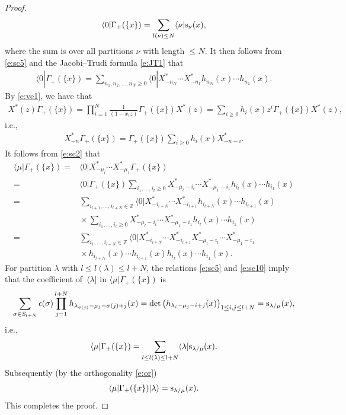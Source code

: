 \documentclass[10pt,a4paper]{amsart}
\numberwithin{equation}{section}
\begin{document}
\begin{proof}
\begin{align}
\langle0|\Gamma_+(\{x\})=\sum_{\substack{l(\nu)\leq N}}\langle\nu|{\rm s}_\nu(x),
\end{align}
where the sum is over all partitions $\nu$ with length $\leq N$. It then follows from \eqref{e:sc5} and the Jacobi--Trudi formula \eqref{e:JT1} that
\begin{align*}%
\langle0|\Gamma_+(\{x\})=\sum_{n_1,n_2,\dots,n_N\geq 0}\langle 0|X^*_{-n_N}\cdots X^*_{-n_1}h_{n_N}(x)\cdots h_{n_1}(x).
\end{align*}
By \eqref{e:ve1}, we have that
\begin{align*}
X^{*}(z)\Gamma_+(\{x\})=\prod^N_{i=1}\frac{1}{(1-x_iz)}\Gamma_+(\{x\})X^{*}(z)
=\sum_{i\geq 0}h_i(x)z^i\Gamma_+(\{x\})X^{*}(z),
\end{align*}
 i.e.,
\begin{align*}
X^{*}_{-n}\Gamma_+(\{x\}) = \Gamma_+(\{x\})\sum_{i\geq 0}h_i(x)X^{*}_{-n-i}.
\end{align*}
It follows from \eqref{e:sc2} that
\begin{align}
\langle\mu|\Gamma_+(\{x\})={}& \langle0|X^{*}_{-\mu_l}\cdots X^{*}_{-\mu_1}\Gamma_+(\{x\}) \nonumber\\
={}& \langle0|\Gamma_+(\{x\})\sum_{i_1,\dots,i_l\geq 0}X^{*}_{-\mu_l-i_l}\cdots X^{*}_{-\mu_1-i_1}h_{i_l}(x)\cdots h_{i_1}(x)\nonumber\\
={}& \sum_{i_{l+1},\dots,i_{l+N}\in\mathbb{Z}}\langle 0|X^*_{-i_{l+N}}\cdots X^*_{-i_{l+1}}h_{i_{l+N}}(x)\cdots h_{i_{l+1}}(x)\nonumber\\
&{}\times \sum_{i_1,\dots,i_l\geq 0}X^{*}_{-\mu_l-i_l}\cdots X^{*}_{-\mu_1-i_1}h_{i_l}(x)\cdots h_{i_1}(x)\nonumber\\
={}& \sum_{i_1,\dots,i_{l+N}\in\mathbb{Z}}\langle 0|X^*_{-i_{l+N}}\cdots X^*_{-i_{l+1}}X^{*}_{-\mu_l-i_l}\cdots X^{*}_{-\mu_1-i_1}\nonumber\\
 &{}\times h_{i_{l+N}}(x)\cdots h_{i_{l+1}}(x)h_{i_l}(x)\cdots h_{i_1}(x).\label{e:sc10}
\end{align}
For partition $\lambda$ with $l\leq l(\lambda)\leq l+N$, the relations \eqref{e:sc5} and \eqref{e:sc10} imply that the coefficient of~$\langle\lambda|$ in $\langle\mu|\Gamma_+(\{x\})$ is
\begin{align*}
\sum_{\sigma\in S_{l+N}}\epsilon(\sigma)\prod^{l+N}_{j=1}h_{\lambda_{\sigma(j)}-\mu_j-\sigma(j)+j}(x) = \det\big(h_{\lambda_i-\mu_j-i+j}(x)\big)_{1\leq i,j\leq l+N} = {\rm s}_{\lambda/\mu}(x),
\end{align*}
i.e.,
\begin{align*}
\langle\mu|\Gamma_+(\{x\}) = \sum_{\substack{l\leq l(\lambda)\leq l+N}}\langle\lambda|{\rm s}_{\lambda/\mu}(x).
\end{align*}
Subsequently (by the orthogonality \eqref{e:or})
\begin{align*}
\langle\mu|\Gamma_+(\{x\})|\lambda\rangle = {\rm s}_{\lambda/\mu}(x).
\end{align*}
This completes the proof.
\end{proof}
\end{document}
